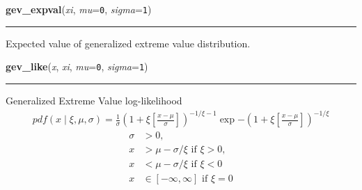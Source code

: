     \label{pymc:distributions:gev_expval}

    \vspace{0.5ex}

    \begin{boxedminipage}{\textwidth}

    \raggedright \textbf{gev\_expval}(\textit{xi}, \textit{mu}=\texttt{0}, \textit{sigma}=\texttt{1})

    \vspace{-1.5ex}

    \rule{\textwidth}{0.5\fboxrule}

Expected value of generalized extreme value distribution.
    \vspace{1ex}

    \end{boxedminipage}

    \label{pymc:distributions:gev_like}

    \vspace{0.5ex}

    \begin{boxedminipage}{\textwidth}

    \raggedright \textbf{gev\_like}(\textit{x}, \textit{xi}, \textit{mu}=\texttt{0}, \textit{sigma}=\texttt{1})

    \vspace{-1.5ex}

    \rule{\textwidth}{0.5\fboxrule}

Generalized Extreme Value log-likelihood
\begin{equation*}\begin{split}pdf(x \mid \xi,\mu,\sigma) = \frac{1}{\sigma}(1 + \xi \left[\frac{x-\mu}{\sigma}\right])^{-1/\xi-1}\exp{-(1+\xi \left[\frac{x-\mu}{\sigma}\right])^{-1/\xi}}\end{split}\end{equation*}\begin{equation*}\begin{split}\sigma & > 0,\\x & > \mu-\sigma/\xi \text{ if } \xi > 0,\\x & < \mu-\sigma/\xi \text{ if } \xi < 0\\x & \in [-\infty,\infty] \text{ if } \xi = 0\end{split}\end{equation*}    \vspace{1ex}

    \end{boxedminipage}

